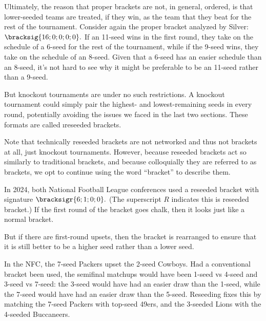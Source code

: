 {    Ultimately, the reason that proper brackets are not, in general, ordered, is that lower-seeded teams are treated, if they win, as the team that they beat for the rest of the tournament. Consider again the proper bracket analyzed by Silver: $\bracksig{16; 0; 0; 0; 0}.$ If an 11-seed wins in the first round, they take on the schedule of a 6-seed for the rest of the tournament, while if the 9-seed wins, they take on the schedule of an 8-seed. Given that a 6-seed has an easier schedule than an 8-seed, it's not hard to see why it might be preferable to be an 11-seed rather than a 9-seed.

    But knockout tournaments are under no such restrictions. A knockout tournament could simply pair the highest- and lowest-remaining seeds in every round, potentially avoiding the issues we faced in the last two sections. These formats are called \i{reseeded brackets}.


    Note that technically reseeded brackets are not networked and thus not brackets at all, just knockout tournaments. However, because reseeded brackets act so similarly to traditional brackets, and because colloquially they are referred to as brackets, we opt to continue using the word ``bracket'' to describe them.

    In 2024, both National Football League conferences \cite{wiki_nfl} used a reseeded bracket with signature $\bracksigr{6; 1; 0; 0}.$ (The superscript $R$ indicates this is reseeded bracket.) If the first round of the bracket goes chalk, then it looks just like a normal bracket.


    But if there are first-round upsets, then the bracket is rearranged to ensure that it is still better to be a higher seed rather than a lower seed.


    In the NFC, the 7-seed Packers upset the 2-seed Cowboys. Had a conventional bracket been used, the semifinal matchups would have been 1-seed vs 4-seed and 3-seed vs 7-seed: the 3-seed would have had an easier draw than the 1-seed, while the 7-seed would have had an easier draw than the 5-seed. Reseeding fixes this by matching the 7-seed Packers with top-seed 49ers, and the 3-seeded Lions with the 4-seeded Buccaneers.

}
